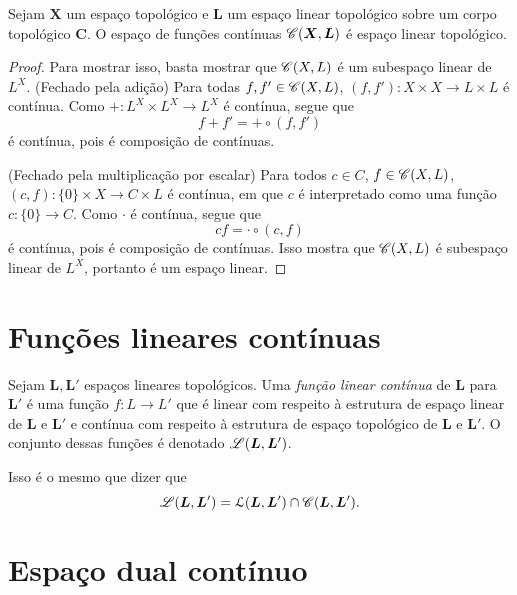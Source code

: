\begin{proposition}
Sejam $\bm X$ um espaço topológico e $\bm L$ um espaço linear topológico sobre um corpo topológico $\bm C$. O espaço de funções contínuas $\mathscr{C}(\bm X,\bm L)$ é espaço linear topológico.
\end{proposition}
\begin{proof}
Para mostrar isso, basta mostrar que $\mathscr{C}(X,L)$ é um subespaço linear de $L^X$. (Fechado pela adição) Para todas $f,f' \in \mathscr{C}(X,L)$, $(f,f')\colon X \times X \to L \times L$ é contínua. Como $+\colon L^X \times L^X \to L^X$ é contínua, segue que
	\begin{equation*}
	f+f' = + \circ (f,f')
	\end{equation*}
é contínua, pois é composição de contínuas.

(Fechado pela multiplicação por escalar) Para todos $c \in C$, $f \in \mathscr{C}(X,L)$, $(c,f)\colon \{0\} \times X \to C \times L$ é contínua, em que $c$ é interpretado como uma função $c\colon \{0\} \to C$. Como $\cdot$ é contínua, segue que
	\begin{equation*}
	cf = \cdot \circ (c,f)
	\end{equation*}
é contínua, pois é composição de contínuas. Isso mostra que $\mathscr{C}(X,L)$ é subespaço linear de $L^X$, portanto é um espaço linear.
\end{proof}



\section{Funções lineares contínuas}

\begin{definition}
Sejam $\bm L, \bm L'$ espaços lineares topológicos. Uma \emph{função linear contínua} de $\bm L$ para $\bm L'$ é uma função $f\colon L \to L'$ que é linear com respeito à estrutura de espaço linear de $\bm L$ e $\bm L'$ e contínua com respeito à estrutura de espaço topológico de $\bm L$ e $\bm L'$. O conjunto dessas funções é denotado $\mathscr{L} (\bm L, \bm L')$.
\end{definition}

Isso é o mesmo que dizer que
	\begin{equation*}
	\mathscr{L} (\bm L, \bm L') = \mathcal{L} (\bm L, \bm L') \cap \mathscr{C}(\bm L, \bm L').
	\end{equation*}


\section{Espaço dual contínuo}

